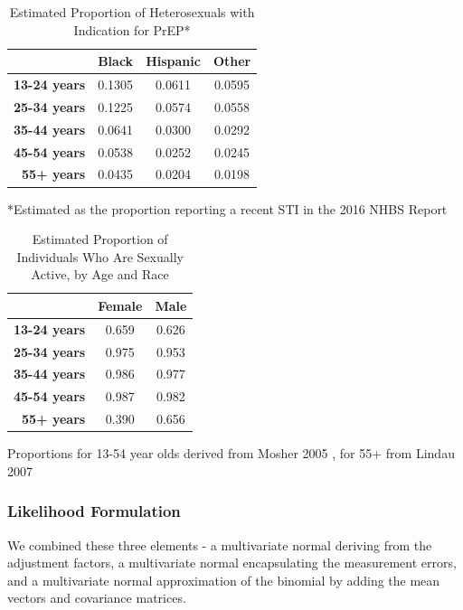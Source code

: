 \documentclass{article}
\begin{document}
\begin{table}[h!]
		\caption{Estimated Proportion of Heterosexuals with Indication for PrEP*}
		\label{prep_indications_heterosexual}
		\begin{tabular}{r|c c c} 
			 & \textbf{Black} & \textbf{Hispanic} & \textbf{Other} \\
			\hline
			\textbf{13-24 years} & 0.1305 & 0.0611 & 0.0595 \\
			\textbf{25-34 years} & 0.1225 & 0.0574 & 0.0558 \\
			\textbf{35-44 years} & 0.0641 & 0.0300 & 0.0292 \\
			\textbf{45-54 years} & 0.0538 & 0.0252 & 0.0245 \\
			\textbf{55+ years} & 0.0435 & 0.0204 & 0.0198 \\
		\end{tabular}
	\begin{flushleft}
	\footnotesize{*Estimated as the proportion reporting a recent STI in the 2016 NHBS Report \cite{nhbs19}}
\end{flushleft}
\end{table}

\begin{table}[h!]
		\caption{Estimated Proportion of Individuals Who Are Sexually Active, by Age and Race}
		\label{sexual_activity_by_age}
		\begin{tabular}{r|c c} 
			 & \textbf{Female} & \textbf{Male} \\
			\hline
			\textbf{13-24 years} & 0.659 & 0.626 \\
			\textbf{25-34 years} & 0.975 & 0.953 \\
			\textbf{35-44 years} & 0.986 & 0.977 \\
			\textbf{45-54 years} & 0.987 & 0.982 \\
			\textbf{55+ years} & 0.390 & 0.656 \\
		\end{tabular}
	\begin{flushleft}
		\footnotesize{Proportions for 13-54 year olds derived from Mosher 2005 \cite{mosher2005}, for 55+ from Lindau 2007 \cite{lindau2007}}
	\end{flushleft}
\end{table}

\subsubsection{Likelihood Formulation}
We combined these three elements - a multivariate normal deriving from the adjustment factors, a multivariate normal encapsulating the measurement errors, and a multivariate normal approximation of the binomial by adding the mean vectors and covariance matrices.
\end{document}

